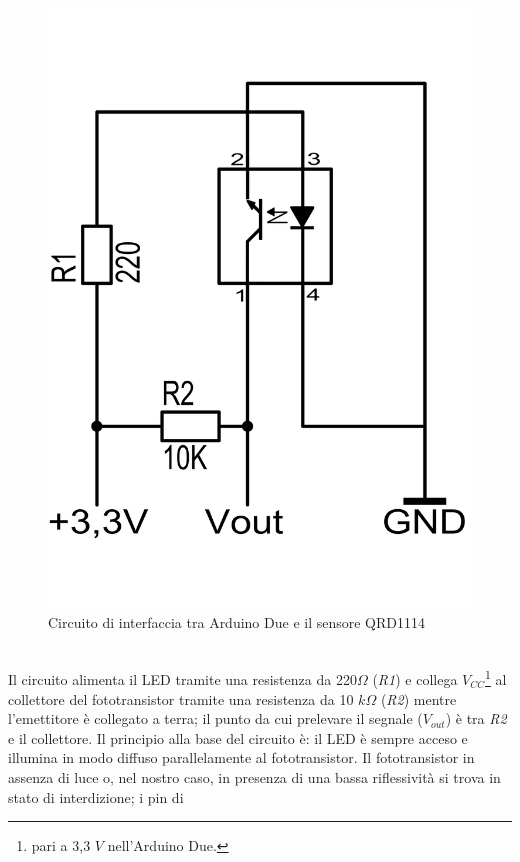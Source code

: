\begin{figure}[!htb] \center
\includegraphics[scale=0.3]{immagini/QRD1114_Circuito.png}
\caption{Circuito di interfaccia tra Arduino Due e il sensore QRD1114} 
\end{figure}
\\Il circuito alimenta il LED tramite una resistenza da 220$\Omega$ (\textit{R1}) 
e collega $V_{CC}$\footnote{pari a 3,3 $V$ nell'Arduino Due.} al collettore del 
fototransistor tramite una resistenza da 10 $k\Omega$ (\textit{R2}) mentre 
l'emettitore è collegato a terra; il punto da cui prelevare il segnale ($V_{out
}$) è tra \textit{R2} e il collettore. Il principio alla base del circuito è: 
il LED è sempre acceso e illumina in modo diffuso parallelamente al 
fototransistor. Il fototransistor in assenza di luce o, nel nostro caso, in 
presenza di una bassa riflessività si trova in stato di interdizione; i pin di 
